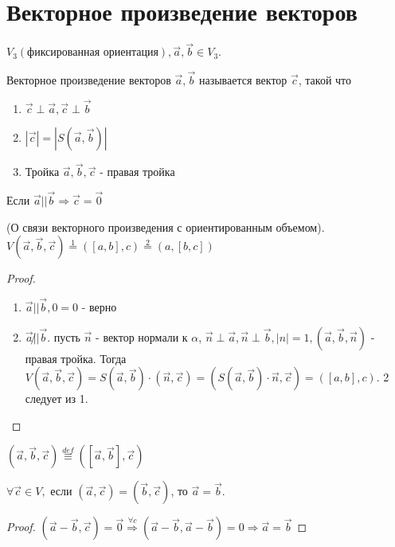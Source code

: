 \section{Векторное произведение векторов}
\(V_3(\text{фиксированная ориентация}), \vec{a}, \vec{b} \in V_3\).
\begin{definition}
	Векторное произведение векторов $\vec{a}, \vec{b}$ называется вектор $\vec{c}$, такой что 
	\begin{enumerate}
		\item $\vec{c}\perp\vec{a}, \vec{c}\perp\vec{b}$
		\item \(|\vec{c}| = |S(\vec{a}, \vec{b})|\)
		\item Тройка $\vec{a}, \vec{b}, \vec{c}$ - правая тройка
	\end{enumerate}
\end{definition}
\begin{note}
	Если $\vec{a} || \vec{b} \Longrightarrow \vec{c} = \vec{0}$
\end{note}
\begin{theorem}
	(О связи векторного произведения с ориентированным объемом). \(V(\vec{a}, \vec{b}, \vec{c}) \overset{1}{=} ([a, b], c) \overset{2}{=} (a, [b, c])\)
\end{theorem}
\begin{proof}
	\begin{enumerate}
		\item $\vec{a} || \vec{b}, 0 = 0$ - верно 
		\item \(\vec{a}\not||\vec{b}\). пусть $\vec{n}$ - вектор нормали к $\alpha$, $\vec{n}\perp \vec{a}, \vec{n}\perp \vec{b}, |n| = 1, (\vec{a}, \vec{b}, \vec{n})$ - правая тройка. Тогда \(V(\vec{a}, \vec{b}, \vec{c}) = S(\vec{a}, \vec{b})\cdot(\vec{n}, \vec{c}) = (S(\vec{a}, \vec{b})\cdot\vec{n}, \vec{c}) = ([a,b],c)\). 2 следует из 1.
	\end{enumerate}
\end{proof}
\begin{note}
	\((\vec{a}, \vec{b}, \vec{c}) \overset{def}{\equiv}([\vec a,\vec b], \vec c)\)
\end{note}
\begin{lemma}
	\(\forall\vec c\in V, \text{ если } (\vec{a}, \vec{c}) = (\vec{b}, \vec{c})\), то $\vec{a} = \vec{b}$.
\end{lemma}
\begin{proof}
	\((\vec{a} - \vec{b}, \vec{c}) = \vec{0} \overset{\forall c}{\Longrightarrow} (\vec{a} - \vec{b}, \vec{a} - \vec{b}) = 0 \Longrightarrow \vec{a} = \vec{b}\)
\end{proof}
